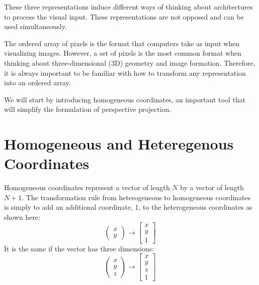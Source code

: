 These three representations induce different ways of thinking about architectures to process the visual input. These representations are not opposed and can be used simultaneously.

The ordered array of pixels is the format that computers take as input when visualizing images. However, a set of pixels is the most common format when thinking about three-dimensional (3D) geometry and image formation. Therefore, it is always important to be familiar with how to transform any representation into an ordered array.


We will start by introducing homogeneous coordinates, an important tool that will simplify the formulation of perspective projection. 


\section{Homogeneous and Heteregenous Coordinates}


Homogeneous coordinates represent a vector of length $N$ by a vector of length $N+1$.
The transformation rule from heterogeneous to homogeneous coordinates is simply to add an additional coordinate, 1, to the heterogeneous coordinates as shown here:
\begin{equation}
    \begin{pmatrix}
    x \\
    y 
    \end{pmatrix}
    \rightarrow 
    \begin{bmatrix}
    x \\
    y \\
    1
    \end{bmatrix}
    \label{eq:2dhomo}
\end{equation}
It is the same if the vector has three dimensions:
\begin{equation}
    \begin{pmatrix}
    x \\
    y \\
    z
    \end{pmatrix}
    \rightarrow 
    \begin{bmatrix}
    x \\
    y \\
    z \\
    1
    \end{bmatrix}
    \label{eq:3dhomo}
\end{equation}


